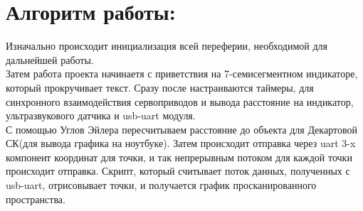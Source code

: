 \documentclass[a4paper, 12pt, twoside]{article}
\begin{document}
\section*{Алгоритм работы:}
Изначально происходит инициализация всей переферии, необходимой для дальнейшей работы. \\
\indent Затем работа проекта начинаетя с приветствия на 7-семисегментном индикаторе, который прокручивает текст. Сразу после настраиваются таймеры, для синхронного взаимодействия сервоприводов и вывода расстояние на индикатор, ультразвукового датчика и usb-uart модуля.\\
\indent С помощью Углов Эйлера пересчитываем расстояние до объекта для Декартовой СК(для  вывода графика на ноутбуке). Затем происходит отправка через uart 3-x компонент координат для точки, и так непрерывным потоком для каждой точки происходит отправка. Скрипт, который считывает поток данных, полученных с usb-uart, отрисовывает точки, и получается график просканированного пространства.    
\end{document}
